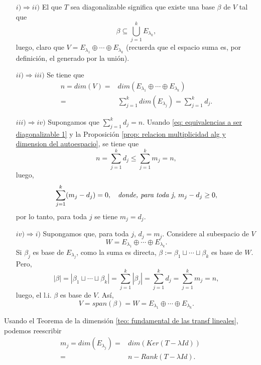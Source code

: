 \begin{itemize}
	\item[$i) \Rightarrow ii)$]
	El que $T$ sea diagonalizable significa que existe una
	base $\beta$ de $V$ tal que
	\[
	\beta \subseteq \bigcup_{j=1}^{k} E_{\lambda_{k}},
	\] 
	luego, 
	claro que $V = E_{\lambda_{1}}  \oplus \cdots \oplus 
	E_{\lambda_{k}}$ (recuerda que el espacio suma es, por definición,
	el generado por la unión).
	\item[$ii) \Rightarrow iii)$] Se tiene que 
	\begin{align*}
		n = dim(V) = & dim(E_{\lambda_{1}} \oplus \cdots \oplus E_{\lambda_{k}} ) \\
		= & \sum_{j=1}^{k} dim(E_{\lambda_{j}}) = 
		\sum_{j=1}^{k} d_{j}.
	\end{align*}
	
	\item[$iii) \Rightarrow iv)$] Supongamos que 
	$\sum_{j=1}^{k}d_{j} = n$. Usando 
	\eqref{eq: equivalencias a ser diagonalizable 1} y 
	la Proposición 
	\ref{prop: relacion multiplicidad alg y dimension del autoespacio}, 
	se tiene que 
	\[
	n = \sum_{j=1}^{k}d_{j} \leq \sum_{j=1}^{k}m_{j} = n,
	\]
	luego, 
	\[
	\sum_{j=1}^{k}(m_{j} - d_{j}) = 0, \hspace{0.2cm}
	\textit{ donde, para toda j, }
	m_{j} - d_{j} \geq 0,
	\]
	por lo tanto, 
	para toda $j$ se tiene $m_{j} = d_{j}$.
	
	\item[$iv) \Rightarrow i)$] Supongamos que,
	para toda $j$, $d_{j} = m_{j}$. Considere al subespacio de $V$
	\[
	W = E_{\lambda_{1}} \oplus \cdots \oplus E_{\lambda_{k}}.
	\]
	Si $\beta_{j}$ es base de $E_{\lambda_{j}}$, como la suma 
	es directa,
	$\beta := \beta_{1} \sqcup \cdots \sqcup \beta_{k}$
	es base de $W$. Pero,
	\[
	|\beta| = |\beta_{1} \sqcup \cdots \sqcup \beta_{k}| 
	= \sum_{j=1}^{k} |\beta_{j}| = 
	\sum_{j=1}^{k} d_{j} = \sum_{j=1}^{k} m_{j} = n,
	\] 
	luego, el l.i. $\beta$ es base de $V$. Así,
	\[
	V = span(\beta) = W = E_{\lambda_{1}} \oplus \cdots \oplus E_{\lambda_{k}}.
	\]
\end{itemize}
\QEDB
\vspace{0.2cm}


Usando el Teorema de la dimensión 
\ref{teo: fundamental de las transf lineales}, podemos reescribir
\begin{align*}
	m_{j} = dim(E_{\lambda_{j}}) = & 
	dim(Ker(T - \lambda Id)) \\
	= & n - Rank(T- \lambda Id).
\end{align*}















